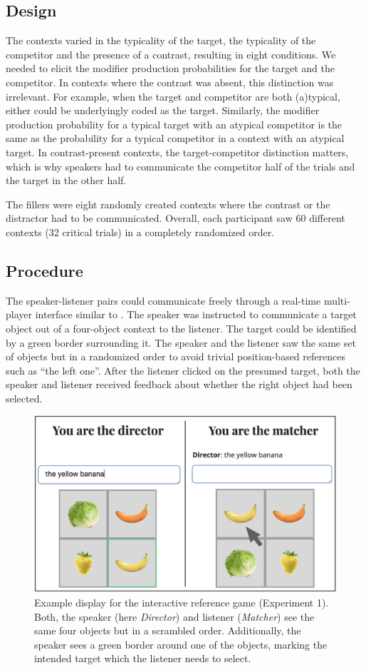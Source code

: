 \documentclass[10pt,letterpaper]{article}
\begin{document}
\subsection{Design}
The contexts varied in the typicality of the target, the typicality of the competitor and the presence of a contrast, resulting in eight conditions. 
We needed to elicit the modifier production probabilities for the target and the competitor. In contexts where the contrast was absent, this distinction was irrelevant. For example, when the target and competitor are both (a)typical, either could be underlyingly coded as the target. Similarly, the modifier production probability for a typical target with an atypical competitor is the same as the probability for a typical competitor in a context with an atypical target. In contrast-present contexts, the target-competitor distinction matters, which is why speakers had to communicate the competitor half of the trials and the target in the other half.

The fillers were eight randomly created contexts where the contrast or the distractor had to be communicated.
Overall, each participant saw 60 different contexts (32 critical trials) in a completely randomized order.


\subsection{Procedure}
The speaker-listener pairs could communicate freely through a real-time multi-player interface similar to \cite{Hawkins:2015}. The speaker was instructed to communicate a target object out of a four-object context to the listener. The target could be identified by a green border surrounding it. The speaker and the listener saw the same set of objects but in a randomized order to avoid trivial position-based references such as ``the left one''. After the listener clicked on the presumed target, both the speaker and listener received feedback about whether the right object had been selected.

\begin{figure}
	\begin{center}
		\includegraphics[width=.475\textwidth]{graphs/prod-design.pdf}
	\end{center}
\caption{Example display for the interactive reference game (Experiment 1). Both, the speaker (here \textit{Director}) and listener (\textit{Matcher}) see the same four objects but in a scrambled order. Additionally, the speaker sees a green border around one of the objects, marking the intended target which the listener needs to select.} 
\label{prod-design}
\end{figure}
\end{document}
